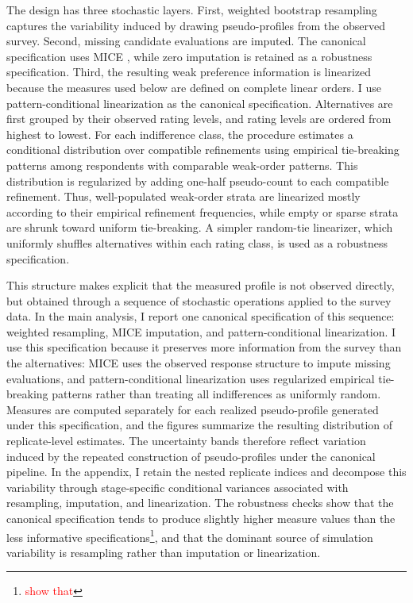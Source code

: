 \documentclass[12pt]{article}
\begin{document}
The design has three stochastic layers. First, weighted bootstrap resampling
captures the variability induced by drawing pseudo-profiles from the observed
survey. Second, missing candidate evaluations are imputed. The canonical
specification uses MICE \parencite{zhang2016multiple}, while zero imputation is
retained as a robustness specification. Third, the resulting weak preference
information is linearized because the measures used below are defined on
complete linear orders. I use pattern-conditional linearization as the canonical
specification. Alternatives are first grouped by their observed rating levels,
and rating levels are ordered from highest to lowest. For each indifference
class, the procedure estimates a conditional distribution over compatible
refinements using empirical tie-breaking patterns among respondents with
comparable weak-order patterns. This distribution is regularized by adding
one-half pseudo-count to each compatible refinement. Thus, well-populated
weak-order strata are linearized mostly according to their empirical refinement
frequencies, while empty or sparse strata are shrunk toward uniform
tie-breaking. A simpler random-tie linearizer, which uniformly shuffles
alternatives within each rating class, is used as a robustness specification.

This structure makes explicit that the measured profile is not observed
directly, but obtained through a sequence of stochastic operations applied to
the survey data. In the main analysis, I report one canonical specification of
this sequence: weighted resampling, MICE imputation, and pattern-conditional
linearization. I use this specification because it preserves more information from the survey
than the alternatives: MICE uses the observed response structure
to impute missing evaluations, and pattern-conditional linearization uses
regularized empirical tie-breaking patterns rather than treating all
indifferences as uniformly random.  Measures are computed separately for each realized
pseudo-profile generated under this specification, and the figures summarize
the resulting distribution of replicate-level estimates. The uncertainty bands
therefore reflect variation induced by the repeated construction of
pseudo-profiles under the canonical pipeline. In the appendix, I retain the
nested replicate indices and decompose this variability through stage-specific
conditional variances associated with resampling, imputation, and
linearization. The robustness checks show that the canonical specification tends to produce slightly
higher measure values than the less informative specifications\footnote{\textcolor{red}{show that}}, and that the
dominant source of simulation variability is resampling rather than imputation
or linearization.
\end{document}

